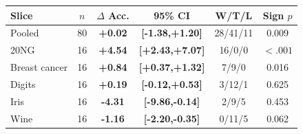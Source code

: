 \begin{tabular}{lccccc}
\toprule
Slice & $n$ & $\Delta$ Acc. & 95\% CI & W/T/L & Sign $p$ \\
\midrule
Pooled & 80 & \textbf{+0.02} & \textbf{[-1.38,+1.20]} & 28/41/11 & 0.009 \\
20NG & 16 & \textbf{+4.54} & \textbf{[+2.43,+7.07]} & 16/0/0 & $<.001$ \\
Breast cancer & 16 & \textbf{+0.84} & \textbf{[+0.37,+1.32]} & 7/9/0 & 0.016 \\
Digits & 16 & \textbf{+0.19} & \textbf{[-0.12,+0.53]} & 3/12/1 & 0.625 \\
Iris & 16 & \textbf{-4.31} & \textbf{[-9.86,-0.14]} & 2/9/5 & 0.453 \\
Wine & 16 & \textbf{-1.16} & \textbf{[-2.20,-0.35]} & 0/11/5 & 0.062 \\
\bottomrule
\end{tabular}
